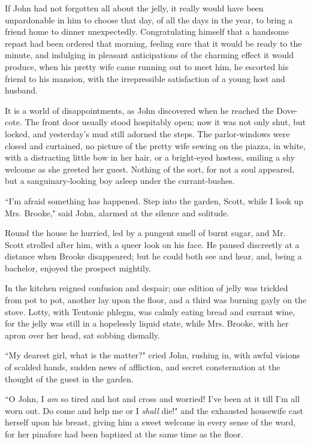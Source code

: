 If John had not forgotten all about the jelly, it really would have been
unpardonable in him to choose that day, of all the days in the year, to
bring a friend home to dinner unexpectedly. Congratulating himself that
a handsome repast had been ordered that morning, feeling sure that it
would be ready to the minute, and indulging in pleasant anticipations of
the charming effect it would produce, when his pretty wife came running
out to meet him, he escorted his friend to his mansion, with the
irrepressible satisfaction of a young host and husband.

It is a world of disappointments, as John discovered when he reached the
Dove-cote. The front door usually stood hospitably open; now it was not
only shut, but locked, and yesterday's mud still adorned
the steps. The parlor-windows were closed and curtained, no picture of
the pretty wife sewing on the piazza, in white, with a distracting
little bow in her hair, or a bright-eyed hostess, smiling a shy welcome
as she greeted her guest. Nothing of the sort, for not a soul appeared,
but a sanguinary-looking boy asleep under the currant-bushes.

``I'm afraid something has happened. Step into the
garden, Scott, while I look up Mrs. Brooke," said John, alarmed at the
silence and solitude.

Round the house he hurried, led by a pungent smell of burnt sugar, and
Mr. Scott strolled after him, with a queer look on his face. He paused
discreetly at a distance when Brooke disappeared; but he could both see
and hear, and, being a bachelor, enjoyed the prospect mightily.

In the kitchen reigned confusion and despair; one edition of jelly was
trickled from pot to pot, another lay upon the floor, and a third was
burning gayly on the stove. Lotty, with Teutonic phlegm, was calmly
eating bread and currant wine, for the jelly was still in a hopelessly
liquid state, while Mrs. Brooke, with her apron over her head, sat
sobbing dismally.

``My dearest girl, what is the matter?" cried John, rushing in, with
awful visions of scalded hands, sudden news of affliction, and secret
consternation at the thought of the guest in the garden.

``O John, I \emph{am} so tired and hot and cross and worried!
I've been at it till I'm all worn out.
Do come and help me or I \emph{shall} die!" and the exhausted housewife
cast herself upon his breast, giving him a sweet welcome in every sense
of the word, for her pinafore had been baptized at the same time as the
floor.

